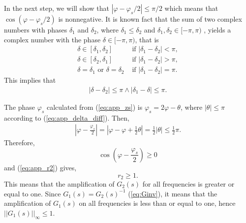 \documentclass[final,5p,times,twocolumn]{elsarticle}
\begin{document}
In the next step, we will show that $|\varphi-\varphi_s/2| \leq \pi/2$ which means that $\cos\left(\varphi-\varphi_s/2 \right)$ is nonnegative. It is known fact that the sum of two complex numbers with phases $\delta_1$ and $\delta_2$, where $\delta_1 \leq \delta_2$ and $\delta_1, \delta_2 \in [-\pi,\pi)$ , yields a complex number with the phase $\delta \in [-\pi,\pi)$, that is
\begin{align}
  \delta \in [\delta_1,\delta_2] &\text{ if } |\delta_1-\delta_2| < \pi, \\
  \delta \in [\delta_2,\delta_1] &\text{ if } |\delta_1-\delta_2| > \pi, \\
  \delta = \delta_1 \text{ or } \delta = \delta_2 &\text{ if } |\delta_1-\delta_2| = \pi.
\end{align}
This implies that
\begin{align}
|\delta-\delta_2|\leq \pi \wedge |\delta_1-\delta| \leq \pi. \label{eq:app_delta_diff}
\end{align}

The phase $\varphi_s$ calculated from (\ref{eq:app_zs}) is $\varphi_s = 2\varphi - \theta$, where $ |\theta| \leq \pi$ according to (\ref{eq:app_delta_diff}). Then,
\begin{align}
\left| \varphi -\frac{\varphi_s}{2} \right| = \left| \varphi-\varphi+\frac{1}{2}\theta \right| = \frac{1}{2}|\theta| \leq \frac{1}{2} \pi.
\end{align}
Therefore,
\begin{equation}
  \cos\left(\varphi-\frac{\varphi_s}{2} \right) \geq 0
\end{equation}
and (\ref{eq:app_r2}) gives,
\begin{equation}
  r_2 \geq 1.
\end{equation}
This means that the amplification of $G_2(s)$ for all frequencies is greater or equal to one. Since $G_1(s) = G_2(s)^{-1}$ (\ref{eq:Ginv}), it means that the amplification of $G_1(s)$ on all frequencies is less than or equal to one, hence $||G_1(s)||_{\infty} \leq 1$.





\end{document}
